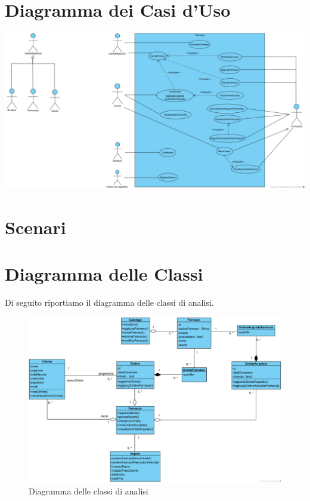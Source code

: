 \section{Diagramma dei Casi d'Uso}
\includegraphics[width=\linewidth]{assets/UseCaseFarmacia.png}

\section{Scenari}

















\pagebreak

\section{Diagramma delle Classi}
Di seguito riportiamo il diagramma delle classi di analisi.
\begin{figure}[!hbp]
	\centering
	\includegraphics[width=\linewidth]{assets/ClassDiagramAnalisi.png}
	\caption{Diagramma delle classi di analisi}
\end{figure}


